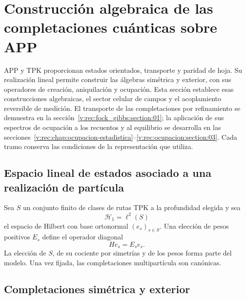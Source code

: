 \section{Construcción algebraica de las completaciones cuánticas sobre APP}
\label{v:rec:chap:completaciones-cuanticas}
\label{v:sec:completaciones-algebraicas}

APP y TPK proporcionan estados orientados, transporte y paridad de hoja.
Su realización lineal permite construir las álgebras simétrica y exterior,
con sus operadores de creación, aniquilación y ocupación. Esta sección
establece esas construcciones algebraicas, el sector celular de campos y
el acoplamiento reversible de medición. El transporte de las completaciones
por refinamiento se demuestra en la
sección~\ref{v:rec:fock_gibbs:section:01}; la aplicación de sus espectros de
ocupación a los recuentos y al equilibrio se desarrolla en las
secciones~\ref{v:rec:chap:ocupacion-estadistica}--\ref{v:rec:ocupacion:section:03}.
Cada tramo conserva las condiciones de la representación que utiliza.

\subsection{Espacio lineal de estados asociado a una realización de partícula}
\label{v:rec:completaciones:section:02}

Sea \(S\) un conjunto finito de clases de rutas TPK a la profundidad elegida
y sea
\[
 \mathcal H_1=\ell^2(S)
\]
el espacio de Hilbert con base ortonormal \((e_s)_{s\in S}\). Una elección de
pesos positivos \(E_s\) define el operador diagonal
\[
 He_s=E_se_s.
\]
La elección de \(S\), de su cociente por simetrías y de los pesos forma parte
del modelo. Una vez fijada, las completaciones multipartícula son canónicas.

\subsection{Completaciones simétrica y exterior}
\label{v:rec:completaciones:section:03}

